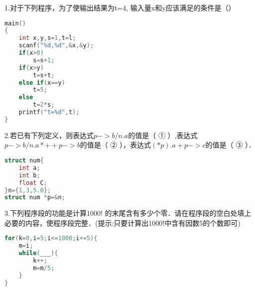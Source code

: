 1.对于下列程序，为了使输出结果为t=4, 输入量x和y应该满足的条件是（） \\
\begin{lstlisting}[language=cpp]
main()
{
    int x,y,s=1,t=l;
    scanf("%d,%d",&x,&y);
    if(x>0)
        s=s+1;
    if(x>y)
        t=s+t;
    else if(x==y)
        t=5;
    else
        t=2*s;
    printf("t=%d",t);
}
\end{lstlisting}

2.若已有下列定义，则表达式$p->b/n.a$的值是（ ① ）,表达式$p->b/n.a*++p->b$的值是（ ② ），表达式$(*p).a+p->c$的值是（ ③ ）．
\begin{lstlisting}[language=cpp]
struct num{
    int a;
    int b;
    float C;
}n={1,3,5.0};
struct num *p=&n;
\end{lstlisting}

3.下列程序段的功能是计算1000! 的末尾含有多少个零．请在程序段的空白处填上必要的内容，使程序段完整．(提示:只要计算出1000!中含有因数5的个数即可)
\begin{lstlisting}[language=cpp]
for(k=0,i=5;i<=1000;i+=5){
    m=i;
    while(___){
        k++;
        m=m/5;
    }
}
\end{lstlisting}


